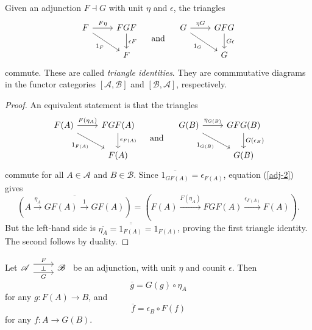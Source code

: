 \begin{lemma}
  Given an adjunction $F\dashv G$ with unit $\eta $ and $\epsilon $, the triangles
  \[
  \begin{tikzcd}
    F \arrow[r,"F\eta "] \arrow[rd,"1_{F}"'] &FGF \arrow[d,"\epsilon F"] \\
					     & F
  \end{tikzcd} \quad\text{ and } \quad
  \begin{tikzcd}
    G \arrow[r,"\eta G"]\arrow[rd,"1_G"']  & GFG \arrow[d,"G\epsilon "] \\
					   & G
  \end{tikzcd}
  \] 
  commute. These are called \textit{triangle identities}. They are commmutative diagrams in the functor categories $\left[ \mathscr{A},\mathscr{B} \right] $ and $[\mathscr{B},\mathscr{A}]$, respectively.
\end{lemma}

\begin{proof}
  An equivalent statement is that the triangles
  \[
  \begin{tikzcd}
    F(A)\arrow[r,"F(\eta_{A})"] \arrow[rd,"1_{F(A)}"'] & FGF(A)\arrow[d,"\epsilon _{F(A)}"] \\
    & F(A)
  \end{tikzcd}\quad \text{ and }\quad 
  \begin{tikzcd}
    G(B)\arrow[r,"\eta_{G(B)}"] \arrow[rd, "1_{G(B)}"'] & GFG(B)\arrow[d,"G(\epsilon _B)"] \\
    & G(B)
  \end{tikzcd}
  \] commute for all $A\in \mathscr{A}$ and $B\in \mathscr{B}$.
  Since $\overline{1_{GF(A)}}=\epsilon _{F(A)}$, equation (\ref{adj-2}) gives
  \[
    \overline{\left(A\xrightarrow{\eta_A} GF(A) \xrightarrow{1}GF(A)\right)}=\left( F(A)\xrightarrow{F(\eta_A)}FGF(A)\xrightarrow{\epsilon_{F(A)}}F(A) \right) .
  \] 
  But the left-hand side is $\overline{\eta_A}=\overline{\overline{1_{F(A)}}}=1_{F(A)}$, proving the first triangle identity. The second follows by duality.
\end{proof}

\begin{lemma}
  Let$
  \begin{tikzcd}\mathscr{A}\arrow[r, shift left=2, "F"]  \arrow[r, shift right=2,"\bot", "G"'] &\mathscr{B}
  \end{tikzcd}$ be an adjunction, with unit $\eta $ and counit $\epsilon $. Then
  \[
    \overline{g}=G(g)\circ \eta_A
  \] for any $g:F(A)\to B$, and 
  \[
    \overline{f}=\epsilon _B\circ F(f)
  \] for any $f:A\to G(B)$.
\end{lemma}

